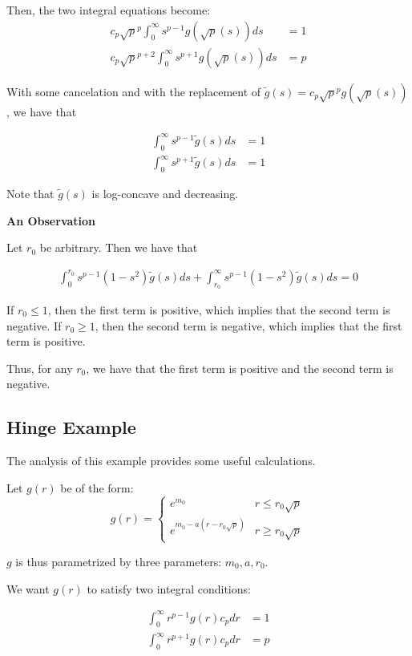 \documentclass{article}
\begin{document}
Then, the two integral equations become:
\begin{align*}
c_p \sqrt{p}^p \int_0^\infty s^{p-1} g(\sqrt{p}(s)) ds &= 1 \\
c_p \sqrt{p}^{p+2} \int_0^\infty s^{p+1} g(\sqrt{p}(s)) ds &= p 
\end{align*}

With some cancelation and with the replacement of $\tilde{g}(s) = c_p \sqrt{p}^p g(\sqrt{p}(s))$, we have that

\begin{align*}
\int_0^\infty s^{p-1} \tilde{g}(s) ds &= 1 \\
\int_0^\infty s^{p+1} \tilde{g}(s) ds &= 1
\end{align*}

Note that $\tilde{g}(s)$ is log-concave and decreasing. 

\textbf{An Observation}

Let $r_0$ be arbitrary. Then we have that

\begin{align*}
\int_0^{r_0} s^{p-1} (1 - s^2) \tilde{g}(s) ds + \int_{r_0}^\infty s^{p-1} (1 - s^2) \tilde{g}(s) ds = 0
\end{align*}

If $r_0 \leq 1$, then the first term is positive, which implies that the second term is negative.
If $r_0 \geq 1$, then the second term is negative, which implies that the first term is positive.

Thus, for any $r_0$, we have that the first term is positive and the second term is negative. 

\subsection{Hinge Example}


The analysis of this example provides some useful calculations.

Let $g(r)$ be of the form:
\[
g(r) = \left\{ \begin{array}{ll}
       e^{m_0} & r \leq r_0 \sqrt{p} \\
    e^{m_0 - a(r - r_0\sqrt{p})} & r \geq r_0 \sqrt{p} 
          \end{array} \right.
\]

$g$ is thus parametrized by three parameters: $m_0, a, r_0$.

We want $g(r)$ to satisfy two integral conditions:

\begin{align*}
\int_0^\infty r^{p-1} g(r) c_p dr &= 1 \\
\int_0^\infty r^{p+1} g(r) c_p dr &= p 
\end{align*}
\end{document}
